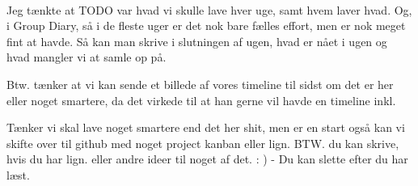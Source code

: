 \documentclass[a4paper,12pt]{article}
\begin{document}
\ls\\{\color{red} Jeg tænkte at TODO var hvad vi skulle lave hver uge, samt hvem laver hvad. Og, i Group Diary, så i de fleste uger er det nok bare fælles effort, men er nok meget fint at havde. Så kan man skrive i slutningen af ugen, hvad er nået i ugen og hvad mangler vi at samle op på. 

Btw. tænker at vi kan sende et billede af vores timeline til sidst om det er her eller noget smartere, da det virkede til at han gerne vil havde en timeline inkl.

Tænker vi skal lave noget smartere end det her shit, men er en start også kan vi skifte over til github med noget project kanban eller lign. BTW. du kan skrive, hvis du har lign. eller andre ideer til noget af det. : ) - Du kan slette efter du har læst.}\ls








\end{document}
